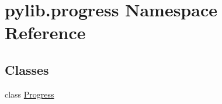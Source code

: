 \hypertarget{namespacepylib_1_1progress}{}\section{pylib.\+progress Namespace Reference}
\label{namespacepylib_1_1progress}
\subsection*{Classes}
\begin{DoxyCompactItemize}
\item 
class \hyperlink{classpylib_1_1progress_1_1Progress}{Progress}
\end{DoxyCompactItemize}
